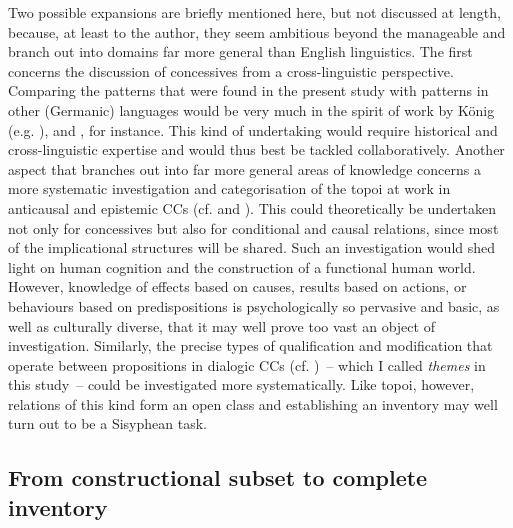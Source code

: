 \begin{sloppypar}
Two possible expansions are briefly mentioned here, but not discussed at length, because, at least to the author, they seem ambitious beyond the manageable and branch out into domains far more general than English linguistics. The first concerns the discussion of concessives from a cross-linguistic perspective. Comparing the patterns that were found in the present study with patterns in other (Germanic) languages would be very much in the spirit of work by König (e.g. \citeyear{König1988,König1994,König2006}), \citet{Kortmann1996} and \citet{Rudolph1996}, for instance. This kind of undertaking would require historical and cross-linguistic expertise and would thus best be tackled collaboratively. Another aspect that branches out into far more general areas of knowledge concerns a more systematic investigation and categorisation of the topoi at work in anticausal and epistemic CCs (cf.  and ). This could theoretically be undertaken not only for concessives but also for conditional and causal relations, since most of the implicational structures will be shared. Such an investigation would shed light on human cognition and the construction of a functional human world. However, knowledge of effects based on causes, results based on actions, or behaviours based on predispositions is psychologically so pervasive and basic, as well as culturally diverse, that it may well prove too vast an object of investigation. Similarly, the precise types of qualification and modification that operate between propositions in dialogic CCs (cf. )~– which I called \textit{themes} in this study~– could be investigated more systematically. Like topoi, however, relations of this kind form an open class and establishing an inventory may well turn out to be a Sisyphean task.
\end{sloppypar}

\subsection{\label{bkm:Ref81995769}From constructional subset to complete inventory}\label{sec:12.2.1}

